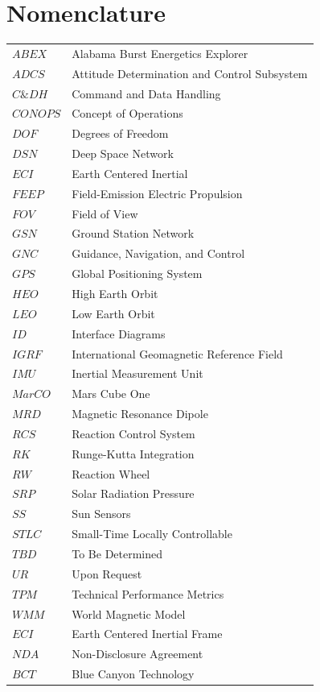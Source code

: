 \documentclass[conf]{new-aiaa}
\begin{document}
\section{Nomenclature}
{\renewcommand\arraystretch{1.0}
\begin{longtable*}{@{}l @{\quad=\quad} l@{}}
$ABEX$  & Alabama Burst Energetics Explorer \\
$ADCS$  & Attitude Determination and Control Subsystem \\
$C\&DH$ & Command and Data Handling \\
$CONOPS$  & Concept of Operations \\
$DOF$  & Degrees of Freedom \\
$DSN$  & Deep Space Network \\
$ECI$ & Earth Centered Inertial \\
$FEEP$ & Field-Emission Electric Propulsion \\
$FOV$ & Field of View \\
$GSN$  & Ground Station Network \\
$GNC$  & Guidance, Navigation, and Control \\
$GPS$  & Global Positioning System \\
$HEO$  & High Earth Orbit \\
$LEO$  & Low Earth Orbit \\
$ID$  & Interface Diagrams \\
$IGRF$  & International Geomagnetic Reference Field \\
$IMU$  & Inertial Measurement Unit \\
$MarCO$  & Mars Cube One \\
$MRD$  & Magnetic Resonance Dipole \\
$RCS$ & Reaction Control System \\
$RK$ & Runge-Kutta Integration\\
$RW$ & Reaction Wheel \\
$SRP$  & Solar Radiation Pressure \\
$SS$  & Sun Sensors \\
$STLC$  & Small-Time Locally Controllable \\
$TBD$  & To Be Determined \\
$UR$  & Upon Request \\
$TPM$  & Technical Performance Metrics \\
$WMM$  & World Magnetic Model \\
$ECI$  & Earth Centered Inertial Frame \\
$NDA$ & Non-Disclosure Agreement \\
$BCT$ & Blue Canyon Technology
\end{longtable*}}
\end{document}
